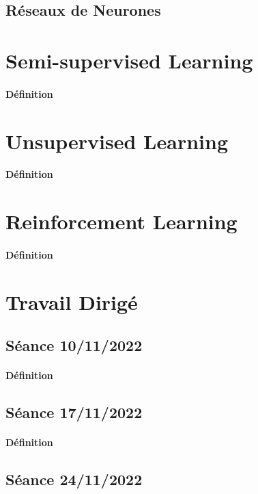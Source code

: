 \documentclass{article}
\begin{document}
\subsection{Réseaux de Neurones}


\section{Semi-supervised Learning}
\paragraph{Définition}

\section{Unsupervised Learning}
\paragraph{Définition}

\section{Reinforcement Learning}
\paragraph{Définition}


\section{Travail Dirigé}
\subsection{Séance 10/11/2022}
\paragraph{Définition}

\subsection{Séance 17/11/2022}
\paragraph{Définition}

\subsection{Séance 24/11/2022}
\end{document}
